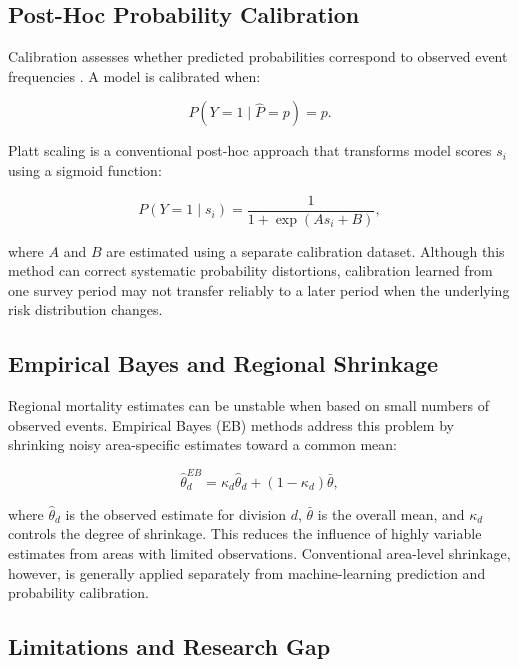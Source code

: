 \documentclass[a4paper,fleqn]{cas-sc}
\begin{document}
\subsection{Post-Hoc Probability Calibration}
\label{sec:conv_calibration}

Calibration assesses whether predicted probabilities correspond to observed event frequencies \cite{vanCalster2019}. A model is calibrated when:

\begin{equation}
P(Y=1\mid \hat{P}=p)=p.
\end{equation}

Platt scaling \cite{platt1999} is a conventional post-hoc approach that transforms model scores $s_i$ using a sigmoid function:

\begin{equation}
P(Y=1\mid s_i)=
\frac{1}{1+\exp(As_i+B)},
\end{equation}

where $A$ and $B$ are estimated using a separate calibration dataset. Although this method can correct systematic probability distortions, calibration learned from one survey period may not transfer reliably to a later period when the underlying risk distribution changes.

\subsection{Empirical Bayes and Regional Shrinkage}
\label{sec:conv_shrinkage}

Regional mortality estimates can be unstable when based on small numbers of observed events. Empirical Bayes (EB) methods \cite{casella1985,efron2012} address this problem by shrinking noisy area-specific estimates toward a common mean:

\begin{equation}
\hat{\theta}_{d}^{EB}
=
\kappa_d\hat{\theta}_d+
(1-\kappa_d)\bar{\theta},
\end{equation}

where $\hat{\theta}_d$ is the observed estimate for division $d$, $\bar{\theta}$ is the overall mean, and $\kappa_d$ controls the degree of shrinkage. This reduces the influence of highly variable estimates from areas with limited observations. Conventional area-level shrinkage, however, is generally applied separately from machine-learning prediction and probability calibration.

\subsection{Limitations and Research Gap}
\label{sec:conv_gap}
\end{document}
